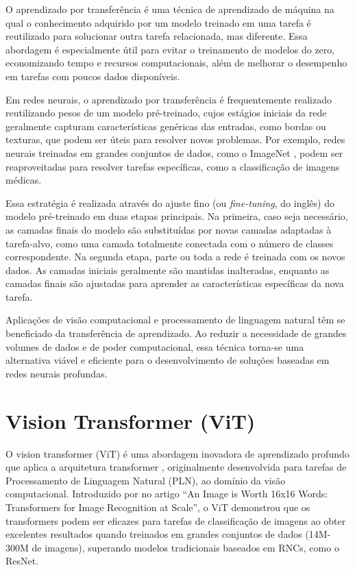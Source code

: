 O aprendizado por transferência \cite{Zhuang2021} é uma técnica de aprendizado de máquina na qual o conhecimento adquirido por um modelo treinado em uma tarefa é reutilizado para solucionar outra tarefa relacionada, mas diferente. Essa abordagem é especialmente útil para evitar o treinamento de modelos do zero, economizando tempo e recursos computacionais, além de melhorar o desempenho em tarefas com poucos dados disponíveis.

Em redes neurais, o aprendizado por transferência é frequentemente realizado reutilizando pesos de um modelo pré-treinado, cujos estágios iniciais da rede geralmente capturam características genéricas das entradas, como bordas ou texturas, que podem ser úteis para resolver novos problemas. Por exemplo, redes neurais treinadas em grandes conjuntos de dados, como o ImageNet \cite{Russakovsky2015}, podem ser reaproveitadas para resolver tarefas específicas, como a classificação de imagens médicas.

Essa estratégia é realizada através do ajuste fino (ou \textit{fine-tuning}, do inglês) do modelo pré-treinado em duas etapas principais. Na primeira, caso seja necessário, as camadas finais do modelo são substituídas por novas camadas adaptadas à tarefa-alvo, como uma camada totalmente conectada com o número de classes correspondente. Na segunda etapa, parte ou toda a rede é treinada com os novos dados. As camadas iniciais geralmente são mantidas inalteradas, enquanto as camadas finais são ajustadas para aprender as características específicas da nova tarefa.

Aplicações de visão computacional e processamento de linguagem natural têm se beneficiado da transferência de aprendizado. Ao reduzir a necessidade de grandes volumes de dados e de poder computacional, essa técnica torna-se uma alternativa viável e eficiente para o desenvolvimento de soluções baseadas em redes neurais profundas.

\section{Vision Transformer (ViT)}\label{sec:vision-transformers}

O vision transformer (ViT) é uma abordagem inovadora de aprendizado profundo que aplica a arquitetura transformer \cite{vaswani2023attentionneed}, originalmente desenvolvida para tarefas de Processamento de Linguagem Natural (PLN), ao domínio da visão computacional. Introduzido por  no artigo ``An Image is Worth 16x16 Words: Transformers for Image Recognition at Scale'', o ViT demonstrou que os transformers podem ser eficazes para tarefas de classificação de imagens ao obter excelentes resultados quando treinados em grandes conjuntos de dados (14M-300M de imagens), superando modelos tradicionais baseados em RNCs, como o ResNet.

